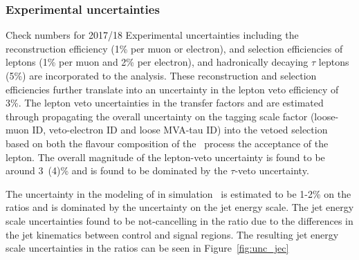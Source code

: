 \subsubsection{Experimental uncertainties}
{\color{red} Check numbers for 2017/18}
Experimental uncertainties including the reconstruction efficiency
(1\% per muon or electron), and selection efficiencies of leptons
(1\% per muon and 2\% per electron), and hadronically
decaying $\tau$ leptons (5\%) are incorporated to the analysis.
These reconstruction and selection efficiencies further translate into an
uncertainty in the lepton veto efficiency of 3\%. The lepton veto uncertainties in the transfer
factors and are estimated through propagating the
overall uncertainty on the tagging scale factor (loose-muon ID,
veto-electron ID and loose MVA-tau ID) into the vetoed selection
based on both the flavour composition of the \Wjets~process the acceptance of the lepton.
The overall magnitude of the lepton-veto uncertainty is found to be around 3~(4)\%
and is found to be dominated by the $\tau$-veto uncertainty.


The uncertainty in the modeling of \MET in simulation~\cite{Khachatryan:2014gga}
is estimated to be 1-2\% on the ratios and is dominated by the uncertainty on the jet energy scale. The
jet energy scale uncertainties found to be not-cancelling in the ratio due to the differences in the
jet kinematics between control and signal regions. The resulting jet energy scale uncertainties in the
ratios can be seen in Figure~\ref{fig:unc_jec}

